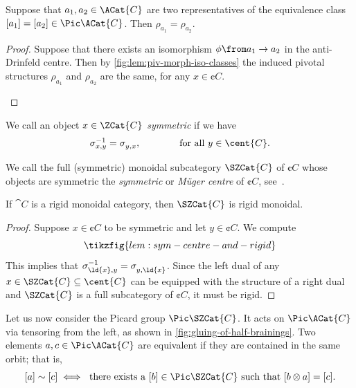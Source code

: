 \begin{lemma}\label{lem: pivotal_morphisms_depend_only_on_iso_class}
  Suppose that \(a_1, a_2 \in \ACat{C}\) are two representatives of the equivalence class \([a_1] = [a_2] \in \Pic \ACat{C}\).
  Then \(\rho_{a_1} = \rho_{a_2}\).
\end{lemma}
\begin{proof}
  Suppose that there exists an isomorphism \(\phi \from a_1 \to a_2\) in the anti\hyp{}Drinfeld centre.
  Then by \cref{fig:lem:piv-morph-iso-classes}
  the induced pivotal structures \(\rho_{a_1}\) and \(\rho_{a_2}\) are the same,
  for any \(x \in \cent{C}\).
  \begin{figure}[htbp]
    \centering
    \vspace{-\onelineskip}%
  \end{figure}
\end{proof}

\begin{definition}\label{def: symmetric_object}
  We call an object \(x \in \ZCat{C}\) \emph{symmetric} if we have
  \[
    \sigma_{x,y}^{-1} = \sigma_{y,x}^{\vphantom{-1}}, \qquad \qquad \text{for all } y \in \cent{C}.
  \]

  We call the full (symmetric) monoidal subcategory \(\SZCat{C}\) of \(\cent{C}\)
  whose objects are symmetric the \emph{symmetric} or \emph{Müger centre} of \(\cent{C}\),
  see~\cite{Mueger2013}.
\end{definition}

\begin{lemma}\label{lem: symmetric_centre_and_rigidity}
  If \(\cat{C}\) is a rigid monoidal category, then \(\SZCat{C}\) is rigid monoidal.
\end{lemma}
\begin{proof}
  Suppose \(x \in \cent{C}\) to be symmetric and let \(y \in \cent{C}\).
  We compute
  \[
    \tikzfig{lem:sym-centre-and-rigid}
  \]
  This implies that \(\sigma_{\ld{x},y}^{-1} = \sigma_{y,\ld{x}}^{\vphantom{-1}}\).
  Since the left dual of any \(x \in \SZCat{C} \subseteq \cent{C}\) can be equipped with the structure of a right dual and \(\SZCat{C}\) is a full subcategory of \(\cent{C}\),
  it must be rigid.
\end{proof}

Let us now consider the Picard group \(\Pic \SZCat{C}\).
It acts on \(\Pic \ACat{C}\) via tensoring from the left,
as shown in \cref{fig:gluing-of-half-brainings}.
Two elements \(a, c \in \Pic \ACat{C}\) are equivalent if they are contained in the same orbit;
that is,
\[
  [a] \sim [c] \iff \text{ there exists a } [b] \in\Pic \SZCat{C} \text{ such that } [b \otimes a] = [c].
\]

